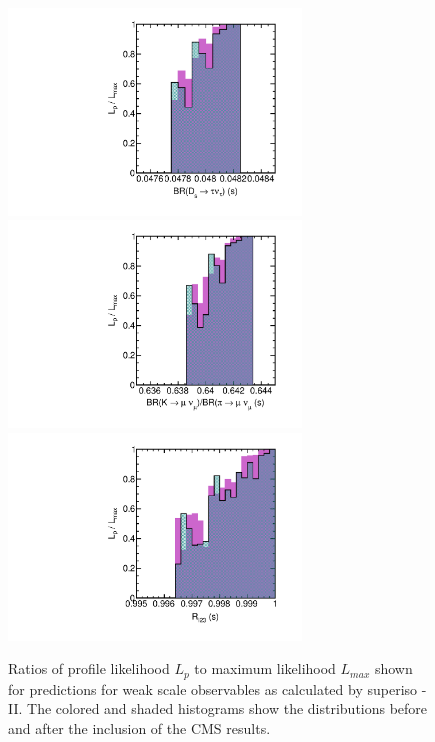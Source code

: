 \begin{figure}[htbp]
\begin{center}
\includegraphics[height=5.5cm]{figs/fig_Dstaunu_s.pdf} 
\includegraphics[height=5.5cm]{figs/fig_Kmunu_pimunu_s.pdf} \\
\includegraphics[height=5.5cm]{figs/fig_Rl23_s.pdf} 
\caption{Ratios of profile likelihood $L_p$ to maximum likelihood $L_{max}$ shown for predictions for weak scale observables as calculated by superiso - II.  The colored and shaded histograms show the distributions before and after the inclusion of the CMS results.}
\label{fig:LRwcms_EWobs_s2}
\end{center}
\end{figure}





